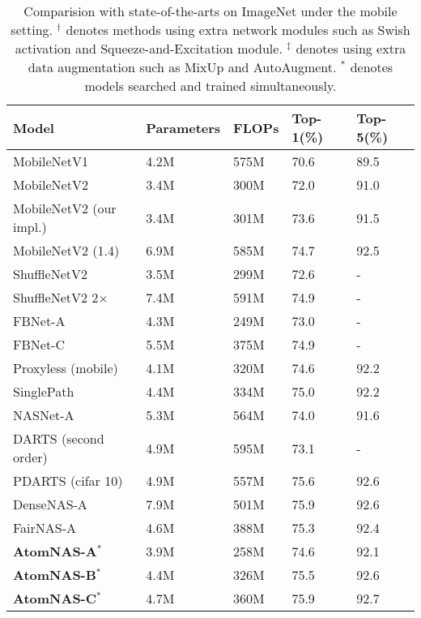 \documentclass{article} \usepackage{iclr2020_conference,times}
\newcommand{\flops}{FLOPs\xspace}
\begin{document}
\begin{table}[t]
\caption{Comparision with state-of-the-arts on ImageNet under the mobile setting. $^\dag$ denotes methods using extra network modules such as Swish activation and Squeeze-and-Excitation module. $^\ddag$ denotes using extra data augmentation such as MixUp and AutoAugment. $^*$ denotes models searched and trained simultaneously.}
\label{sample-table}
\begin{center}
\begin{tabular}{lllll}
\toprule
Model & Parameters & \flops & Top-1(\%) & Top-5(\%) \\
\midrule
MobileNetV1 \citep{howard2017mobilenet}           & 4.2M & 575M & 70.6 & 89.5 \\
MobileNetV2 \citep{sandler2018mobilenetv2}        & 3.4M & 300M & 72.0 & 91.0 \\
MobileNetV2 (our impl.)                           & 3.4M & 301M & 73.6 & 91.5 \\
MobileNetV2 (1.4) & 6.9M & 585M & 74.7 & 92.5 \\
ShuffleNetV2 \citep{ma2018shufflenet_v2}          & 3.5M & 299M & 72.6 & - \\
ShuffleNetV2 2$\times$      & 7.4M & 591M & 74.9 & - \\
\midrule
FBNet-A \citep{wu2019fbnet}         & 4.3M & 249M & 73.0 & - \\
FBNet-C         & 5.5M & 375M & 74.9 & - \\
Proxyless (mobile) \citep{han2019proxyless}                  & 4.1M & 320M & 74.6 & 92.2 \\
SinglePath \citep{stamoulis2019single_path} & 4.4M & 334M & 75.0 & 92.2 \\
NASNet-A \citep{zoph2017nasnet}     & 5.3M & 564M & 74.0 & 91.6 \\
DARTS (second order) \citep{hanxiao2019darts}      & 4.9M & 595M & 73.1 & - \\
PDARTS (cifar 10) \citep{chen2019pdarts}       & 4.9M & 557M & 75.6 & 92.6 \\
DenseNAS-A \citep{fang2019densenas} & 7.9M & 501M & 75.9 & 92.6 \\
FairNAS-A \citep{chu2019fairnas} & 4.6M & 388M & 75.3 & 92.4 \\

\textbf{AtomNAS-A}$^*$  & 3.9M & 258M & 74.6 & 92.1 \\
\textbf{AtomNAS-B}$^*$  & 4.4M & 326M & 75.5 & 92.6 \\
\textbf{AtomNAS-C}$^*$  & 4.7M & 360M & 75.9 & 92.7 \\


\end{tabular}
\end{center}
\end{table}
\end{document}
